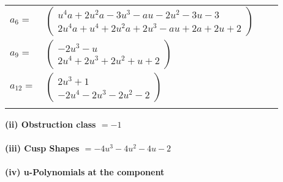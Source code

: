 \documentclass[1p]{elsarticle_modified}
\theoremstyle{definition}
\begin{document}
\begin{tabular}{m{7pt} m{180pt} m{7pt} m{180pt} }
\flushright $a_{6}=$&$\begin{pmatrix}u^4 a+2 u^2 a-3 u^3- a u-2 u^2-3 u-3\\2 u^4 a+u^4+2 u^2 a+2 u^3- a u+2 a+2 u+2\end{pmatrix}$ \\
\flushright $a_{9}=$&$\begin{pmatrix}-2 u^3- u\\2 u^4+2 u^3+2 u^2+u+2\end{pmatrix}$ \\
\flushright $a_{12}=$&$\begin{pmatrix}2 u^3+1\\-2 u^4-2 u^3-2 u^2-2\end{pmatrix}$\\&\end{tabular}
\flushleft \textbf{(ii) Obstruction class $= -1$}\\~\\
\flushleft \textbf{(iii) Cusp Shapes $= -4 u^3-4 u^2-4 u-2$}\\~\\
\newpage\renewcommand{\arraystretch}{1}
\flushleft \textbf{(iv) u-Polynomials at the component}\newline \\
\end{document}
